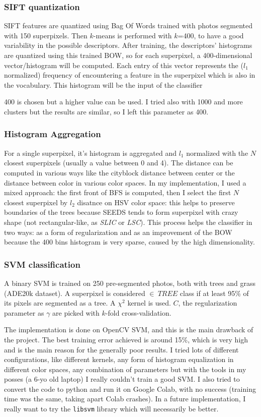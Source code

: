 \documentclass[a4paper,titlepaget]{article}
\begin{document}
\subsubsection{SIFT quantization}
SIFT features are quantized using Bag Of Words trained with photos segmented with 150 superpixels. Then $k$-means is performed with $k$=400, to have a good variability in the possible descriptors. 
After training, the descriptors' histograms are quantized using this trained BOW, so for each superpixel, a 400-dimensional vector/histogram will be computed. Each entry of this vector represents the ($l_1$ normalized) frequency of encountering a feature in the superpixel which is also in the vocabulary. This histogram will be the input of the classifier

400 is chosen but a higher value can be used. I tried also with 1000 and more clusters but the results are similar, so I left this parameter as 400.

\subsubsection{Histogram Aggregation}
For a single superpixel, it's histogram is aggregated and $l_1$ normalized with the $N$ closest superpixels (usually a value between 0 and 4). The distance can be computed in various ways like the cityblock distance between center or the distance between color in various color spaces. In my implementation, I used a mixed approach: the first front of BFS is computed, then I select the first $N$ closest superpixel by $l_2$ disatnce on HSV color space: this helps to preserve boundaries of the trees because SEEDS tends to form superpixel with crazy shape (not rectangular-like, as \emph{SLIC} or \emph{LSC}). 
This process helps the classifier in two ways: as a form of regularization and as an improvement of the BOW because the 400 bins histogram is very sparse, caused by the high dimensionality.

\subsubsection{SVM classification}
A binary SVM is trained on 250 pre-segmented photos, both with trees and grass (ADE20k dataset). A superpixel is considered $\in \ TREE$ class if at least 95\% of its pixels are segmented as a tree. A $\chi^2$ kernel is used. $C$, the regularization parameter as $\gamma$ are picked with $k$-fold cross-validation. 

The implementation is done on OpenCV SVM, and this is the main drawback of the project. The best training error achieved is around 15\%, which is very high and is the main reason for the generally poor results. I tried lots of different configurations, like different kernels, any form of histogram equalization in different color spaces, any combination of parameters but with the tools in my posses (a 6-yo old laptop) I really couldn't train a good SVM. I also tried to convert the code to python and run it on Google Colab, with no success (training time was the same, taking apart Colab crashes). In a future implementation, I really want to try the \texttt{libsvm} library which will necessarily be better. 
\end{document}
